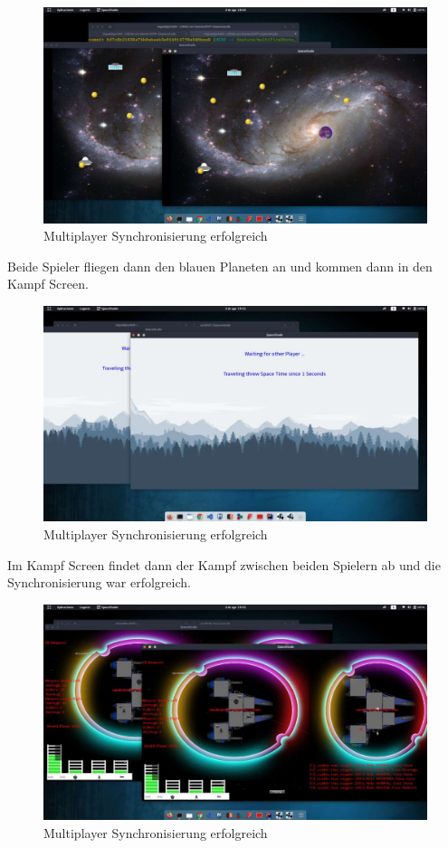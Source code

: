 \documentclass[12pt]{article}
\begin{document}
\begin{figure}[htp]
	\centering
	\includegraphics[scale=0.4]{TestProtocolBilder/Multiplayer/5.jpg}
	\caption{Multiplayer Synchronisierung erfolgreich}
\end{figure}
\clearpage
Beide Spieler fliegen dann den blauen Planeten an und kommen dann in den Kampf Screen.
\begin{figure}[htp]
	\centering
	\includegraphics[scale=0.4]{TestProtocolBilder/Multiplayer/6.jpg}
	\caption{Multiplayer Synchronisierung erfolgreich}
\end{figure}
\clearpage
Im Kampf Screen findet dann der Kampf zwischen beiden Spielern ab und die Synchronisierung war erfolgreich.
\begin{figure}[htp]
	\centering
	\includegraphics[scale=0.4]{TestProtocolBilder/Multiplayer/7.jpg}
	\caption{Multiplayer Synchronisierung erfolgreich}
\end{figure}
\end{document}
